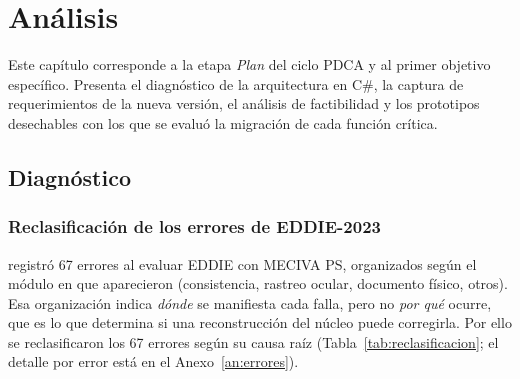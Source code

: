 \chapter{Análisis}
\label{cap:analisis}

Este capítulo corresponde a la etapa \textit{Plan} del ciclo PDCA y al primer objetivo específico. Presenta el diagnóstico de la arquitectura en C\#, la captura de requerimientos de la nueva versión, el análisis de factibilidad y los prototipos desechables con los que se evaluó la migración de cada función crítica.

\section{Diagnóstico}
\label{sec:diagnostico}

\subsection{Reclasificación de los errores de EDDIE-2023}

\citet{ibaceta2023} registró 67 errores al evaluar EDDIE con MECIVA PS, organizados según el módulo en que aparecieron (consistencia, rastreo ocular, documento físico, otros). Esa organización indica \emph{dónde} se manifiesta cada falla, pero no \emph{por qué} ocurre, que es lo que determina si una reconstrucción del núcleo puede corregirla. Por ello se reclasificaron los 67 errores según su causa raíz (Tabla~\ref{tab:reclasificacion}; el detalle por error está en el Anexo~\ref{an:errores}).

